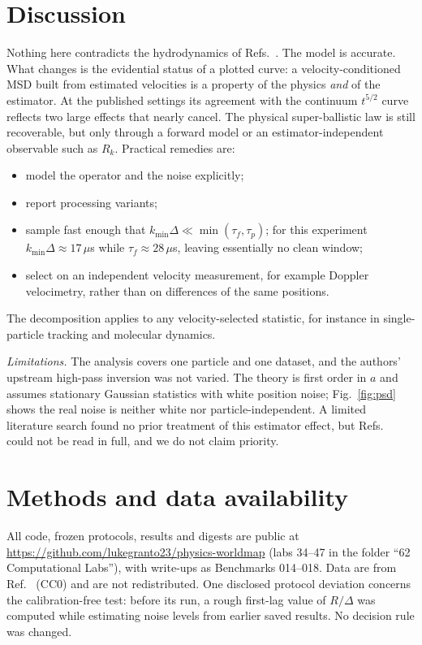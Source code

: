 \documentclass[aps,pre,10pt,twocolumn,superscriptaddress,amsmath,amssymb]{revtex4-2}
\begin{document}
\section{Discussion}

Nothing here contradicts the hydrodynamics of Refs.~\cite{HaugeMartinLof1973,Hinch1975,Boynewicz2026}. The model is accurate. What changes is the evidential status of a plotted curve: a velocity-conditioned MSD built from estimated velocities is a property of the physics \emph{and} of the estimator. At the published settings its agreement with the continuum $t^{5/2}$ curve reflects two large effects that nearly cancel. The physical super-ballistic law is still recoverable, but only through a forward model or an estimator-independent observable such as $R_k$. Practical remedies are:
\begin{itemize}
\item model the operator and the noise explicitly;
\item report processing variants;
\item sample fast enough that $k_{\min}\Delta\ll\min(\tau_f,\tau_p)$; for this experiment $k_{\min}\Delta\approx17\,\mu$s while $\tau_f\approx28\,\mu$s, leaving essentially no clean window;
\item select on an independent velocity measurement, for example Doppler velocimetry, rather than on differences of the same positions.
\end{itemize}
The decomposition applies to any velocity-selected statistic, for instance in single-particle tracking and molecular dynamics.

\emph{Limitations.} The analysis covers one particle and one dataset, and the authors' upstream high-pass inversion was not varied. The theory is first order in $a$ and assumes stationary Gaussian statistics with white position noise; Fig.~\ref{fig:psd} shows the real noise is neither white nor particle-independent. A limited literature search found no prior treatment of this estimator effect, but Refs.~\cite{FractalPreprint2026,PreparedPreprint2026} could not be read in full, and we do not claim priority.

\section*{Methods and data availability}

All code, frozen protocols, results and digests are public at \url{https://github.com/lukegranto23/physics-worldmap} (labs 34--47 in the folder ``62 Computational Labs''), with write-ups as Benchmarks 014--018. Data are from Ref.~\cite{Dryad2026} (CC0) and are not redistributed. One disclosed protocol deviation concerns the calibration-free test: before its run, a rough first-lag value of $R/\Delta$ was computed while estimating noise levels from earlier saved results. No decision rule was changed.
\end{document}
